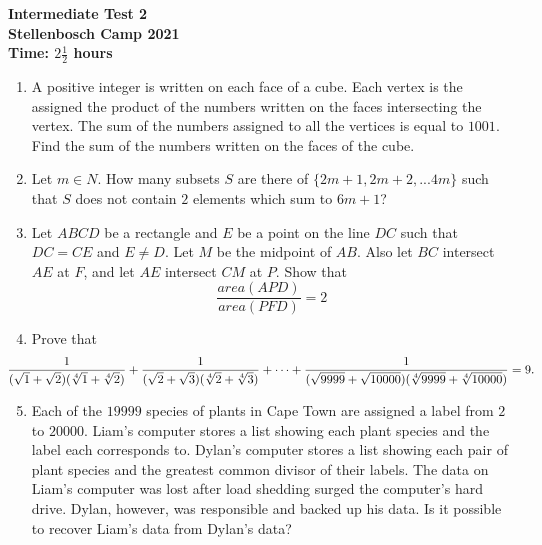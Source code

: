 \documentclass{article}
\begin{document}
\thispagestyle{empty}

\begin{center}
  \textbf{\Large Intermediate Test 2}
  \\ \vspace{1em}
  \textbf{\large Stellenbosch Camp 2021}
  \\ \vspace{1em}
  \textbf{\large Time: $2\frac{1}{2}$ hours}
\end{center}

\bigskip

\begin{enumerate}[itemsep=\fill]


\item %
A positive integer is written on each face of a cube. Each vertex is the assigned the product of the numbers written on the faces intersecting the vertex. The sum of the numbers assigned to all the vertices is equal to $1001$. Find the sum of the numbers written on the faces of the cube.

\item %
Let $m \in {N}$. How many subsets $S$ are there of $\{2m+1,2m+2,...4m\}$ such that $S$ does not contain $2$ elements which sum to $6m+1$? 

\item %
Let $ABCD$ be a rectangle and $E$ be a point on the line $DC$ such that $DC = CE$ and $E \neq D$.  Let $M$ be the midpoint of $AB$.  Also let $BC$ intersect $AE$ at $F$, and let $AE$ intersect $CM$ at $P$.  Show that $$\frac{area(APD)}{area(PFD)} = 2$$

\item %
Prove that
\[ \mspace{-36mu} \frac{1}{(\sqrt{1}+\sqrt{2})(\sqrt[4]{1}+\sqrt[4]{2})} +\frac{1}{(\sqrt{2}+\sqrt{3})(\sqrt[4]{2}+\sqrt[4]{3})} +\dotsb +\frac{1}{(\sqrt{9999}+\sqrt{10000})(\sqrt[4]{9999}+\sqrt[4]{10000})} = 9. \]

\item %
Each of the $19 999$ species of plants in Cape Town are assigned a label from $2$ to $20 000$. Liam's computer stores a list showing each plant species and the label each corresponds to. Dylan's computer stores a list showing each pair of plant species and the greatest common divisor of their labels. The data on Liam's computer was lost after load shedding surged the computer's hard drive. Dylan, however, was responsible and backed up his data. Is it possible to recover Liam's data from Dylan's data?

\end{enumerate}
\end{document}
